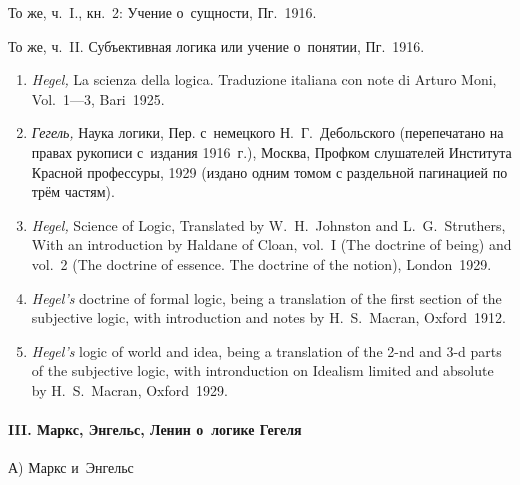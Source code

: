 То же, ч.~I., кн.~2: Учение о~сущности, Пг.~1916.

То же, ч.~II. Субъективная логика или учение о~понятии, Пг.~1916.

\begin{enumerate}
\item
{\em Hegel,} La scienza della logica. Traduzione italiana con note di
Arturo Moni, Vol.~1---3, Bari~1925.

\item
{\em Гегель,} Наука логики, Пер. с~немецкого Н.~Г.~Дебольского
(перепечатано на правах рукописи с~издания 1916~г.), Москва, Профком
слушателей Института Красной профессуры, 1929 (издано одним томом с
раздельной пагинацией по трём частям).

\item
{\em Hegel,} Science of Logic, Translated by W.~H.~Johnston and
L.~G.~Struthers, With an intro\-duction by Haldane of Cloan, vol.~I
(The doctrine of being) and vol.~2 (The doctrine of essence. The doctrine of
the notion), London~1929.

\item{\em Hegel's} doctrine of formal logic, being a translation of the first
section of the subjective logic, with intro\-duction and notes by
H.~S.~Macran, Oxford~1912.

\item{\em Hegel's} logic of world and idea, being a translation of the 2-nd and
3-d parts of the subjective logic, with intro\-nduction on Idealism limited and
absolute by H.~S.~Macran, Oxford~1929.
\end{enumerate}

\paragraph%
[III. Маркс, Энгельс, Ленин о~логике Гегеля]%
{III. Маркс, Энгельс, Ленин о~логике Гегеля}

{\centering А) Маркс и~Энгельс \par}

